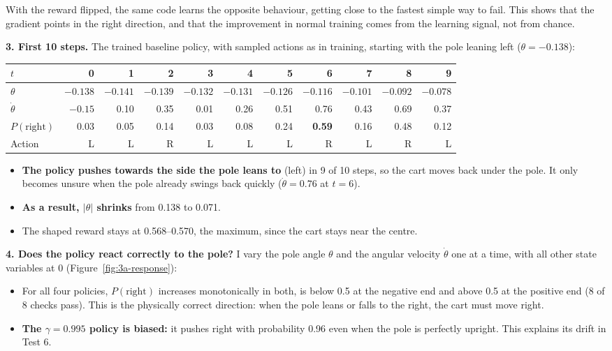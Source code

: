 
With the reward flipped, the same code learns the opposite behaviour, getting close to the fastest simple way to fail. This shows that the gradient points in the right direction, and that the improvement in normal training comes from the learning signal, not from chance.

\textbf{3. First 10 steps.} The trained baseline policy, with sampled actions as in training, starting with the pole leaning left ($\theta = -0.138$):

\begin{center}
\small
\setlength{\tabcolsep}{4.5pt}
\begin{tabular}{@{}l*{10}{r}@{}}
  \toprule
  $t$ & 0 & 1 & 2 & 3 & 4 & 5 & 6 & 7 & 8 & 9 \\
  \midrule
  $\theta$ & $-0.138$ & $-0.141$ & $-0.139$ & $-0.132$ & $-0.131$ & $-0.126$ & $-0.116$ & $-0.101$ & $-0.092$ & $-0.078$ \\
  $\dot\theta$ & $-0.15$ & 0.10 & 0.35 & 0.01 & 0.26 & 0.51 & 0.76 & 0.43 & 0.69 & 0.37 \\
  $P(\text{right})$ & 0.03 & 0.05 & 0.14 & 0.03 & 0.08 & 0.24 & \textbf{0.59} & 0.16 & 0.48 & 0.12 \\
  Action & L & L & R & L & L & L & R & L & R & L \\
  \bottomrule
\end{tabular}
\end{center}

\begin{itemize}
  \item \textbf{The policy pushes towards the side the pole leans to} (left) in 9 of 10 steps, so the cart moves back under the pole. It only becomes unsure when the pole already swings back quickly ($\dot\theta = 0.76$ at $t = 6$).
  \item \textbf{As a result, $|\theta|$ shrinks} from 0.138 to 0.071.
  \item The shaped reward stays at 0.568--0.570, the maximum, since the cart stays near the centre.
\end{itemize}

\textbf{4. Does the policy react correctly to the pole?} I vary the pole angle $\theta$ and the angular velocity $\dot\theta$ one at a time, with all other state variables at 0 (Figure~\ref{fig:3a-response}):
\begin{itemize}
  \item For all four policies, $P(\text{right})$ increases monotonically in both, is below 0.5 at the negative end and above 0.5 at the positive end (8 of 8 checks pass). This is the physically correct direction: when the pole leans or falls to the right, the cart must move right.
  \item \textbf{The $\gamma = 0.995$ policy is biased:} it pushes right with probability 0.96 even when the pole is perfectly upright. This explains its drift in Test 6.
\end{itemize}

